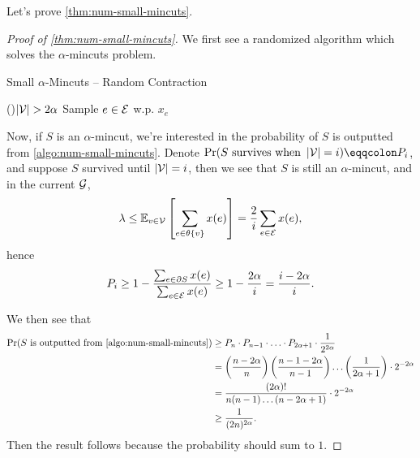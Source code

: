 Let's prove \autoref{thm:num-small-mincuts}.
\begin{proof}[Proof of \autoref{thm:num-small-mincuts}]
	We first see a randomized algorithm which solves the \(\alpha \)-mincuts problem.

	\begin{algorithm}[H]\label{algo:num-small-mincuts}
		\DontPrintSemicolon
		\caption{Small \(\alpha \)-Mincuts -- Random Contraction}
		\BlankLine
		\While(){\(\left\vert \mathcal{\MakeUppercase{v}} \right\vert > 2\alpha\)}{
			Sample \(e\in \mathcal{\MakeUppercase{e}} \)  w.p. \(x_e\)\;
			\;
		}
		\;
	\end{algorithm}

	Now, if \(S\) is an \(\alpha \)-mincut, we're interested in the probability of \(S\) is outputted from \autoref{algo:num-small-mincuts}. Denote \(\Pr(S \text{ survives when } \left\vert \mathcal{\MakeUppercase{v}}  \right\vert = i) \eqqcolon P_i\), and suppose \(S\) survived until \(\left\vert \mathcal{\MakeUppercase{v}}  \right\vert = i\), then we see that \(S\) is still an \(\alpha \)-mincut, and in the current \(\mathcal{\MakeUppercase{g}} \),
	\[
		\lambda \leq \mathbb{E}_{v\in \mathcal{\MakeUppercase{v}} }\left[ \sum_{e\in \theta \left\{ v \right\} } x(e) \right] = \frac{2}{i} \sum_{e\in \mathcal{\MakeUppercase{e}} } x(e),
	\]
	hence
	\[
		P_i \geq 1 - \frac{\sum_{e\in \partial S} x(e)}{\sum_{e\in \mathcal{\MakeUppercase{e}} }x(e) } \geq 1 - \frac{2\alpha }{i} = \frac{i-2\alpha }{i}.
	\]

	We then see that
	\[
		\begin{split}
			\Pr(S \text{ is outputted from \autoref{algo:num-small-mincuts}})
			&\geq P_n \cdot P_{n-1}\cdot \ldots \cdot P_{2\alpha + 1} \cdot \frac{1}{2^{2\alpha }}\\
			&= \left( \frac{n - 2\alpha }{n} \right) \left( \frac{n-1-2\alpha }{n-1} \right) \ldots \left( \frac{1}{2\alpha +1} \right) \cdot 2^{-2\alpha }\\
			&= \frac{(2\alpha )!}{n(n-1)\ldots (n-2\alpha +1) }\cdot 2^{-2\alpha }\\
			&\geq \frac{1}{(2n)^{2\alpha }}.
		\end{split}
	\]
	Then the result follows because the probability should sum to \(1\).
\end{proof}

